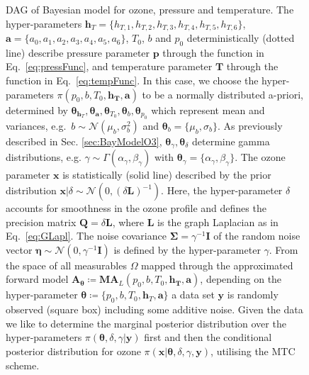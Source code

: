 \begin{figure}[thb!]
	\caption[Directed acyclic graph of Bayesian model for ozone, pressure and temperature.]{DAG of Bayesian model for ozone, pressure and temperature. The hyper-parameters $\bm{h}_T= \{ h_{T,1}, h_{T,2},h_{T,3},h_{T,4},h_{T,5},h_{T,6}\}$, $\bm{a} = \{ a_0, a_1, a_2,a_3,a_4,a_5,a_6\}$, $T_0$, $b$ and $p_0$ deterministically (dotted line) describe pressure parameter $\bm{p}$ through the function in Eq.~\ref{eq:pressFunc}, and temperature parameter $\bm{T}$ through the function in Eq.~\ref{eq:tempFunc}. In this case, we choose the hyper-parameters $\pi(p_0,b,T_0,\bm{h_T},\bm{a})$ to be a normally distributed a-priori, determined by $\bm{\theta}_{\bm{h}_T},\bm{\theta}_{\bm{a}}, \bm{\theta}_{T_{0}},\bm{\theta}_{b} , \bm{\theta}_{p_0}$ which represent mean and variances, e.g.~$b \sim \mathcal{N}(\mu_b, \sigma^2_b)$ and $\bm{\theta}_{b} = \{\mu_b, \sigma_b\}$.
 As previously described in Sec. \ref{sec:BayModelO3}, $\bm{\theta}_{\gamma}, \bm{\theta}_{\delta}$ determine gamma distributions, e.g. $\gamma \sim \Gamma(\alpha_{\gamma},\beta_{\gamma}) $ with $\bm{\theta}_{\gamma} = \{\alpha_{\gamma},\beta_{\gamma} \}$.
The ozone parameter $\bm{x}$ is statistically (solid line) described by the prior distribution $\bm{x}| \delta \sim \mathcal{N}(0,(\delta \bm{L})^{-1}) $. 
		Here, the hyper-parameter $\delta$ accounts for smoothness in the ozone profile and defines the precision matrix $\bm{Q} = \delta \bm{L}$, where $\bm{L}$ is the graph Laplacian as in Eq.~\ref{eq:GLapl}.
		The noise covariance $\bm{\Sigma} = \gamma^{-1} \bm{I}$ of the random noise vector $\bm{\eta} \sim \mathcal{N}(0,\gamma^{-1} \bm{I} ) $ is defined by the hyper-parameter $\gamma$.
		From the space of all measurables $\Omega$ mapped through the approximated forward model $\bm{A}_{\bm{\theta}} \coloneqq \bm{M}\bm{A}_L(p_0,b,T_0,\bm{h_T},\bm{a})$, depending on the hyper-parameter $\bm{\theta}  \coloneqq \{p_0, b, T_0,\bm{h}_T,\bm{a} \}$ a data set $\bm{y}$ is randomly observed (square box) including some additive noise.
		Given the data we like to determine the marginal posterior distribution over the hyper-parameters $\pi(\bm{\theta}, \delta, \gamma | \bm{y})$ first and then the conditional posterior distribution for ozone $\pi(\bm{x}|\bm{\theta}, \delta, \gamma, \bm{y})$, utilising the MTC scheme.}
	\label{fig:DAGComplete}
\end{figure}
